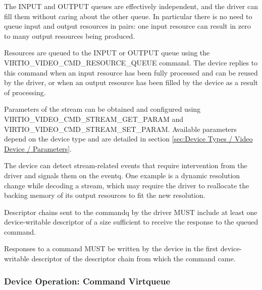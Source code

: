 The INPUT and OUTPUT queues are effectively independent, and the driver
can fill them without caring about the other queue. In particular there
is no need to queue input and output resources in pairs: one input
resource can result in zero to many output resources being produced.

Resources are queued to the INPUT or OUTPUT queue using the
VIRTIO\_VIDEO\_CMD\_RESOURCE\_QUEUE command. The device replies to this
command when an input resource has been fully processed and can be
reused by the driver, or when an output resource has been filled by the
device as a result of processing.

Parameters of the stream can be obtained and configured using
VIRTIO\_VIDEO\_CMD\_STREAM\_GET\_PARAM and
VIRTIO\_VIDEO\_CMD\_STREAM\_SET\_PARAM. Available parameters depend on
the device type and are detailed in section
\ref{sec:Device Types / Video Device / Parameters}.

The device can detect stream-related events that require intervention
from the driver and signals them on the eventq. One example is a dynamic
resolution change while decoding a stream, which may require the driver
to reallocate the backing memory of its output resources to fit the new
resolution.


Descriptor chains sent to the commandq by the driver MUST include at
least one device-writable descriptor of a size sufficient to receive the
response to the queued command.


Responses to a command MUST be written by the device in the first
device-writable descriptor of the descriptor chain from which the
command came.

\subsubsection{Device Operation: Command Virtqueue}\label{sec:Device Types / Video Device / Device Operation / Device Operation: Command Virtqueue}

